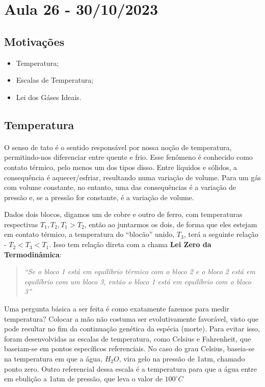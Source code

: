 \documentclass[phsyicsII_notes.tex]{subfiles}
\begin{document}
\section{Aula 26 - 30/10/2023}
\subsection{Motivações}
\begin{itemize}
	\item Temperatura;
	\item Escalas de Temperatura;
	\item Lei dos Gáses Ideais.
\end{itemize}
\subsection{Temperatura}
\paragraph{} O senso de tato é o sentido responsável por nossa noção de temperatura, permitindo-nos diferenciar
entre quente e frio. Esse fenômeno é conhecido como contato térmico, pelo menos um dos tipos disso. Entre líquidos e sólidos,
a consequência é aquecer/esfriar, resultando numa variação de volume. Para um gás com volume constante, no entanto, uma
das consequências é a variação de pressão e, se a pressão for constante, é a variação de volume.

Dados dois blocos, digamos um de cobre e outro de ferro, com temperaturas respectivas \(T_{1}, T_{2}, T_{1} > T_{2}\), então ao
juntarmos os dois, de forma que eles estejam em contato térmico, a temperatura do ``blocão'' unido, \(T_{3}\), terá a seguinte relação -
\(T_{2} < T_{3} < T_{1}\). Isso tem relação direta com a chama \textbf{Lei Zero da Termodinâmica}:
\begin{quote}
	\textit{``Se o bloco 1 está em equilíbrio térmico com o bloco 2 e o bloco 2 está em equilíbrio com um bloco 3, então
		o bloco 1 está em equilíbrio com o bloco 3''}
\end{quote}
Uma pergunta básica a ser feita é como exatamente fazemos para medir temperatura? Colocar a mão não costuma ser evolutivamente favorável, visto que pode resultar
no fim da continuação genética da espécia (morte). Para evitar isso, foram desenvolvidas as escalas de temperatura, como Celsius e Fahrenheit, que baseiam-se
em pontos específicos referenciais. No caso do grau Celsius, baseia-se na temperatura em que a água, \(H_{2}O\), vira gelo na pressão de 1atm, chamado ponto zero.
Outro referencial dessa escala é a temperatura para que a água entre em ebulição a 1atm de pressão, que leva o valor de \(100^{\circ{}}C\)
\end{document}
